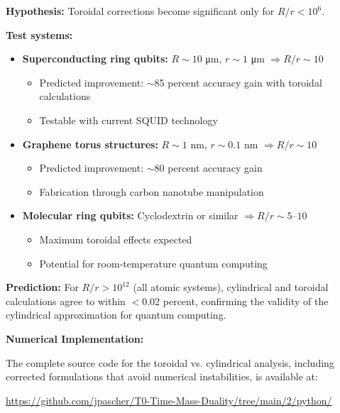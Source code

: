 \begin{experimentbox}
	\textbf{Hypothesis:} Toroidal corrections become significant only for $R/r < 10^6$.
	
	\textbf{Test systems:}
	\begin{itemize}
		\item \textbf{Superconducting ring qubits:} $R \sim 10$ μm, $r \sim 1$ μm $\Rightarrow R/r \sim 10$
		\begin{itemize}
			\item Predicted improvement: $\sim$85 percent accuracy gain with toroidal calculations
			\item Testable with current SQUID technology
		\end{itemize}
		
		\item \textbf{Graphene torus structures:} $R \sim 1$ nm, $r \sim 0.1$ nm $\Rightarrow R/r \sim 10$
		\begin{itemize}
			\item Predicted improvement: $\sim$80 percent accuracy gain
			\item Fabrication through carbon nanotube manipulation
		\end{itemize}
		
		\item \textbf{Molecular ring qubits:} Cyclodextrin or similar $\Rightarrow R/r \sim 5$--$10$
		\begin{itemize}
			\item Maximum toroidal effects expected
			\item Potential for room-temperature quantum computing
		\end{itemize}
	\end{itemize}
	
	\textbf{Prediction:} For $R/r > 10^{12}$ (all atomic systems), cylindrical and toroidal calculations agree to within $<$0.02 percent, confirming the validity of the cylindrical approximation for quantum computing.
\end{experimentbox}

\textbf{Numerical Implementation:}

The complete source code for the toroidal vs. cylindrical analysis, including corrected formulations that avoid numerical instabilities, is available at:

\begin{center}
	\url{https://github.com/jpascher/T0-Time-Mass-Duality/tree/main/2/python/}
\end{center}


